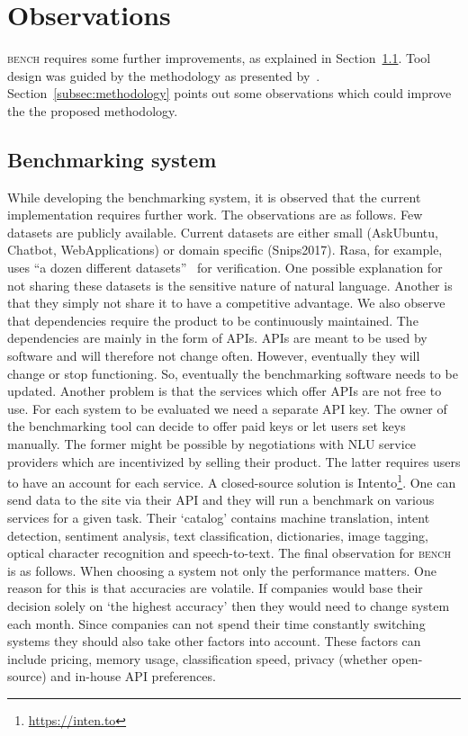 \section{Observations}
\label{sec:observations}

\textsc{bench} requires some further improvements, as explained in Section~\ref{subsec:benchmarking_system}.
Tool design was guided by the methodology as presented by~\citet{braun2017}.
Section~\ref{subsec:methodology} points out some observations which could improve the the proposed methodology.

\subsection{Benchmarking system}
\label{subsec:benchmarking_system}
While developing the benchmarking system, it is observed that the current implementation requires further work.
The observations are as follows.
Few datasets are publicly available.
Current datasets are either small (AskUbuntu, Chatbot, WebApplications) or domain specific (Snips2017).
Rasa, for example, uses ``a dozen different datasets''~\citep{nichol2018vectors} for verification.
One possible explanation for not sharing these datasets is the sensitive nature of natural language.
Another is that they simply not share it to have a competitive advantage.
We also observe that dependencies require the product to be continuously maintained.
The dependencies are mainly in the form of APIs.
APIs are meant to be used by software and will therefore not change often.
However, eventually they will change or stop functioning.
So, eventually the benchmarking software needs to be updated.
Another problem is that the services which offer APIs are not free to use.
For each system to be evaluated we need a separate API key.
The owner of the benchmarking tool can decide to offer paid keys or let users set keys manually.
The former might be possible by negotiations with NLU service providers which are incentivized by selling their product.
The latter requires users to have an account for each service.
A closed-source solution is Intento\footnote{\url{https://inten.to}}.
One can send data to the site via their API and they will run a benchmark on various services for a given task.
Their `catalog' contains machine translation, intent detection, sentiment analysis, text classification, dictionaries, image tagging, optical character recognition and speech-to-text.
The final observation for \textsc{bench} is as follows.
When choosing a system not only the performance matters.
One reason for this is that accuracies are volatile.
If companies would base their decision solely on `the highest accuracy' then they would need to change system each month.
Since companies can not spend their time constantly switching systems they should also take other factors into account.
These factors can include pricing, memory usage, classification speed, privacy (whether open-source) and in-house API preferences.

